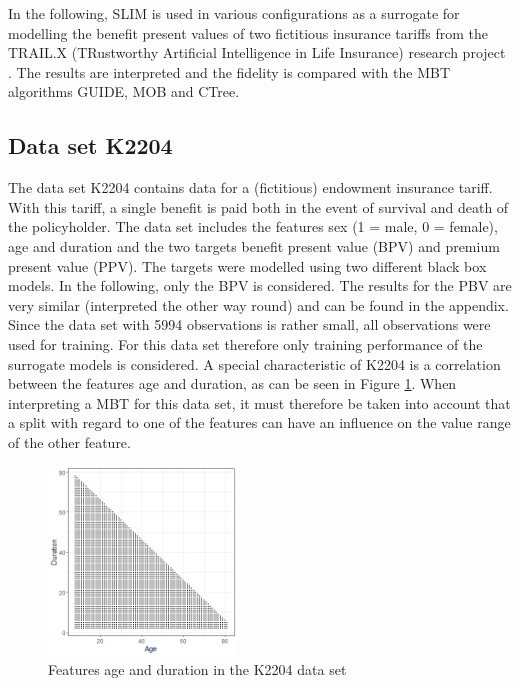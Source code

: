 In the following, SLIM is used in various configurations as a surrogate for modelling the benefit present values of two fictitious insurance tariffs from the TRAIL.X (TRustworthy Artificial Intelligence in Life Insurance) research project \citep{msginsurit.16.03.2023}. The results are interpreted and the fidelity is compared with the MBT algorithms GUIDE, MOB and CTree.

\subsection{Data set K2204} \label{K2204_BPV}

The data set K2204 contains data for a (fictitious) endowment insurance tariff. With this tariff, a single benefit is paid both in the event of survival and death of the policyholder. The data set includes the features sex (1 = male, 0 = female), age and duration and the two targets benefit present value (BPV) and premium present value (PPV). The targets were modelled using two different black box models.  
In the following, only the BPV is considered. The results for the PBV are very similar (interpreted the other way round) and can be found in the appendix.
Since the data set with 5994 observations is rather small, all observations were used for training. For this data set therefore only training performance of the surrogate models is considered.
A special characteristic of K2204 is a correlation between the features age and duration, as can be seen in Figure \ref{fig:ins_corr_age_duration}. When interpreting a MBT for this data set, it must therefore be taken into account that a split with regard to one of the features can have an influence on the value range of the other feature.

\begin{figure}[!htb]
    \centering    
    \includegraphics[width=5cm]{Figures/insurance_use_case/k2204_BPV/corr_age_duration.png}
    \caption{Features age and duration in the K2204 data set}
    \label{fig:ins_corr_age_duration}
\end{figure}


